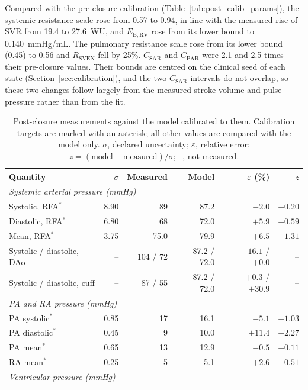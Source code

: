 Compared with the pre-closure calibration (Table~\ref{tab:post_calib_params}), the systemic resistance scale rose from 0.57 to 0.94, in line with the measured rise of SVR from 19.4 to 27.6~WU, and $E_\mathrm{B,RV}$ rose from its lower bound to 0.140~mmHg/mL. The pulmonary resistance scale rose from its lower bound (0.45) to 0.56 and $R_\mathrm{SVEN}$ fell by 25\%. $C_\mathrm{SAR}$ and $C_\mathrm{PAR}$ were 2.1 and 2.5 times their pre-closure values. Their bounds are centred on the clinical seed of each state (Section~\ref{sec:calibration}), and the two $C_\mathrm{SAR}$ intervals do not overlap, so these two changes follow largely from the measured stroke volume and pulse pressure rather than from the fit.

\begin{table}[!htbp]
\centering\small
\caption{Post-closure measurements against the model calibrated to them. Calibration targets are marked with an asterisk; all other values are compared with the model only. $\sigma$, declared uncertainty; $\varepsilon$, relative error; $z = (\text{model}-\text{measured})/\sigma$; --, not measured.}
\label{tab:post_calib}
\setlength{\tabcolsep}{4pt}
\begin{tabular}{lrrrrr}
\toprule
\textbf{Quantity} & $\sigma$ & \textbf{Measured} & \textbf{Model} & $\varepsilon$ (\%) & $z$ \\
\midrule
\multicolumn{6}{l}{\emph{Systemic arterial pressure (mmHg)}} \\
Systolic, RFA$^*$ & 8.90 & 89 & 87.2 & $-2.0$ & $-0.20$ \\
Diastolic, RFA$^*$ & 6.80 & 68 & 72.0 & $+5.9$ & $+0.59$ \\
Mean, RFA$^*$ & 3.75 & 75.0 & 79.9 & $+6.5$ & $+1.31$ \\
Systolic / diastolic, DAo & -- & 104 / 72 & 87.2 / 72.0 & $-16.1$ / $+0.0$ & -- \\
Systolic / diastolic, cuff & -- & 87 / 55 & 87.2 / 72.0 & $+0.3$ / $+30.9$ & -- \\
\multicolumn{6}{l}{\emph{PA and RA pressure (mmHg)}} \\
PA systolic$^*$ & 0.85 & 17 & 16.1 & $-5.1$ & $-1.03$ \\
PA diastolic$^*$ & 0.45 & 9 & 10.0 & $+11.4$ & $+2.27$ \\
PA mean$^*$ & 0.65 & 13 & 12.9 & $-0.5$ & $-0.11$ \\
RA mean$^*$ & 0.25 & 5 & 5.1 & $+2.6$ & $+0.51$ \\
\multicolumn{6}{l}{\emph{Ventricular pressure (mmHg)}} \\

\end{tabular}
\end{table}
